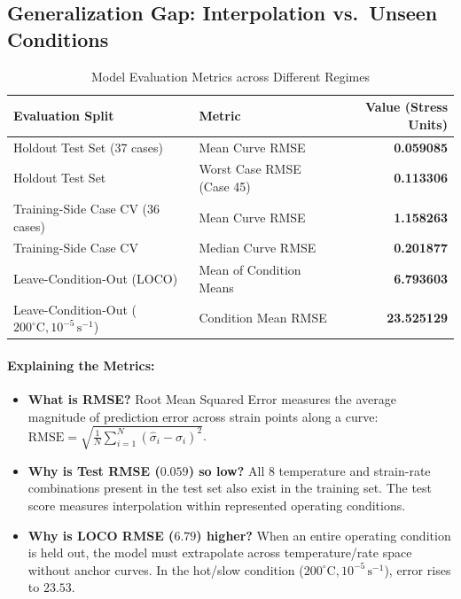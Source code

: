 \documentclass[11pt,a4paper]{article}
\begin{document}
\subsection{Generalization Gap: Interpolation vs.\ Unseen Conditions}
\begin{table}[h]
\centering
\caption{Model Evaluation Metrics across Different Regimes}
\vspace{0.5em}
\begin{tabular}{llr}
\toprule
\textbf{Evaluation Split} & \textbf{Metric} & \textbf{Value (Stress Units)} \\
\midrule
Holdout Test Set (37 cases) & Mean Curve RMSE & \textbf{0.059085} \\
Holdout Test Set & Worst Case RMSE (Case 45) & \textbf{0.113306} \\
Training-Side Case CV (36 cases) & Mean Curve RMSE & \textbf{1.158263} \\
Training-Side Case CV & Median Curve RMSE & \textbf{0.201877} \\
Leave-Condition-Out (LOCO) & Mean of Condition Means & \textbf{6.793603} \\
Leave-Condition-Out ($200^\circ\text{C}, 10^{-5}\,\text{s}^{-1}$) & Condition Mean RMSE & \textbf{23.525129} \\
\bottomrule
\end{tabular}
\end{table}

\paragraph{Explaining the Metrics:}
\begin{itemize}
    \item \textbf{What is RMSE?} Root Mean Squared Error measures the average magnitude of prediction error across strain points along a curve: $\text{RMSE} = \sqrt{\frac{1}{N}\sum_{i=1}^N (\hat{\sigma}_i - \sigma_i)^2}$.
    \item \textbf{Why is Test RMSE ($0.059$) so low?} All 8 temperature and strain-rate combinations present in the test set also exist in the training set. The test score measures interpolation within represented operating conditions.
    \item \textbf{Why is LOCO RMSE ($6.79$) higher?} When an entire operating condition is held out, the model must extrapolate across temperature/rate space without anchor curves. In the hot/slow condition ($200^\circ\text{C}, 10^{-5}\,\text{s}^{-1}$), error rises to $23.53$.
\end{itemize}
\end{document}
